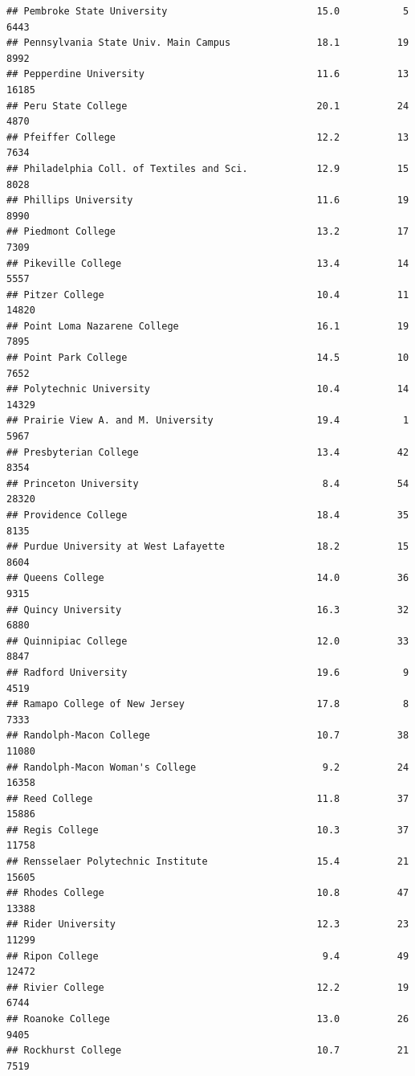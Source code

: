 \documentclass[
]{article}
\begin{document}
\begin{verbatim}
## Pembroke State University                          15.0           5   6443
## Pennsylvania State Univ. Main Campus               18.1          19   8992
## Pepperdine University                              11.6          13  16185
## Peru State College                                 20.1          24   4870
## Pfeiffer College                                   12.2          13   7634
## Philadelphia Coll. of Textiles and Sci.            12.9          15   8028
## Phillips University                                11.6          19   8990
## Piedmont College                                   13.2          17   7309
## Pikeville College                                  13.4          14   5557
## Pitzer College                                     10.4          11  14820
## Point Loma Nazarene College                        16.1          19   7895
## Point Park College                                 14.5          10   7652
## Polytechnic University                             10.4          14  14329
## Prairie View A. and M. University                  19.4           1   5967
## Presbyterian College                               13.4          42   8354
## Princeton University                                8.4          54  28320
## Providence College                                 18.4          35   8135
## Purdue University at West Lafayette                18.2          15   8604
## Queens College                                     14.0          36   9315
## Quincy University                                  16.3          32   6880
## Quinnipiac College                                 12.0          33   8847
## Radford University                                 19.6           9   4519
## Ramapo College of New Jersey                       17.8           8   7333
## Randolph-Macon College                             10.7          38  11080
## Randolph-Macon Woman's College                      9.2          24  16358
## Reed College                                       11.8          37  15886
## Regis College                                      10.3          37  11758
## Rensselaer Polytechnic Institute                   15.4          21  15605
## Rhodes College                                     10.8          47  13388
## Rider University                                   12.3          23  11299
## Ripon College                                       9.4          49  12472
## Rivier College                                     12.2          19   6744
## Roanoke College                                    13.0          26   9405
## Rockhurst College                                  10.7          21   7519

\end{verbatim}
\end{document}
